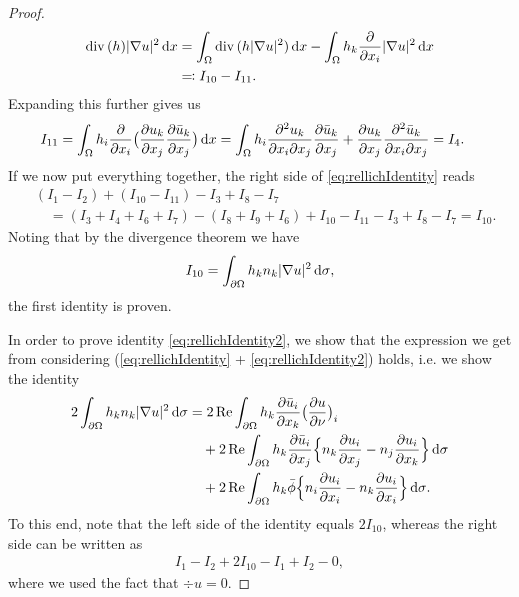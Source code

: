 \begin{proof}
  \begin{align*}
    \mathrm{div\,} (h) |\nabla u|^2 \, {\operatorname{d}\!{x}}
    &= \int_\Omega \mathrm{div\,} ( h|\nabla u|^2) \, {\operatorname{d}\!{x}} - \int_\Omega h_k \frac{\partial}{\partial x_i} |\nabla u|^2 \, {\operatorname{d}\!{x}} \\
    &\eqqcolon I_{10} - I_{11}.
  \end{align*}
  Expanding this further gives us
  \begin{align*}
    I_{11}
    &= \int_\Omega h_i \frac{\partial}{\partial x_i} \big( \frac{\partial u_k}{\partial x_j} \frac{\partial \bar u_k}{\partial x_j} \big) \, {\operatorname{d}\!{x}}
    = \int_\Omega h_i  \frac{\partial^2 u_k}{\partial x_i \partial x_j} \frac{\partial \bar u_k}{\partial x_j} + \frac{\partial u_k}{\partial x_j} \frac{\partial^2 \bar u_k}{\partial x_i \partial x_j} = I_4.
  \end{align*}
  If we now put everything together, the right side of \eqref{eq:rellichIdentity} reads
  \begin{align*}
    &(I_1 - I_2) + (I_{10} - I_{11}) - I_3 + I_8 - I_7 \\
    &\quad= (I_3 + I_4 + I_6 + I_7) - (I_8 + I_9 + I_6) + I_{10} - I_{11} - I_3 + I_8 - I_7 = I_{10}.
  \end{align*}
  Noting that by the divergence theorem we have
  \begin{align*}
    I_{10} = \int_{\partial\Omega} h_k n_k |\nabla u|^2 \, {\operatorname{d}\!{\sigma}},
  \end{align*}
  the first identity is proven.

  In order to prove identity \eqref{eq:rellichIdentity2}, we show that the expression we get from considering (\eqref{eq:rellichIdentity} + \eqref{eq:rellichIdentity2}) holds, i.e. we show the identity
  \begin{align*}
    2 \int_{\partial\Omega} h_k n_k |\nabla u|^2 \, {\operatorname{d}\!{\sigma}}
    &= 2 \operatorname{Re} \int_{\partial\Omega} h_k \frac{\partial \bar u_i}{\partial x_k} \big( \frac{\partial u}{\partial \nu} \big)_i \\
    &\quad + 2 \operatorname{Re} \int_{\partial\Omega} h_k \frac{\partial\bar u_i}{\partial x_j} \Big\{ n_k \frac{\partial u_i}{\partial x_j} - n_j \frac{\partial u_i}{\partial x_k} \Big\} \, {\operatorname{d}\!{\sigma}} \\
    &\quad+ 2 \operatorname{Re} \int_{\partial\Omega} h_k \bar \phi \Big\{ n_i \frac{\partial u_i}{\partial x_i} - n_k \frac{\partial u_i}{\partial x_i} \Big \} \, {\operatorname{d}\!{\sigma}}.
  \end{align*}
  To this end, note that the left side of the identity equals $2 I_10$, whereas the right side can be written as 
  \begin{align*}
    I_1 - I_2 + 2 I_{10} - I_1 + I_2 - 0,
  \end{align*}
  where we used the fact that $\div u = 0$.
\end{proof}

